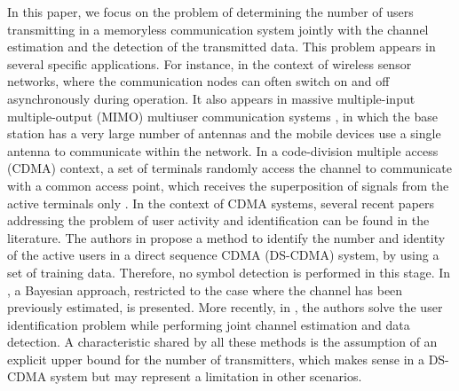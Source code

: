 \documentclass[a4paper]{article}
\begin{document}
In this paper, we focus on the problem of determining the number of users transmitting in a memoryless communication
system jointly with the channel estimation and the detection of the transmitted data. 
%
This problem appears in several specific applications. For instance, in the context of wireless sensor networks, where the communication nodes can often switch on and off asynchronously during operation. It also appears in massive multiple-input multiple-output (MIMO) multiuser communication systems \cite{Hoydis13}, in which the base station has a very large number of antennas and the mobile devices use a single antenna to communicate within the network. In a code-division multiple access (CDMA) context, a set of terminals randomly access the channel to communicate with a common access point, which receives the superposition of signals from the active terminals only \cite{Vazquez2013}. In the context of CDMA systems, several recent papers addressing the problem of user activity and identification can be found in the literature. The authors in \cite{AD10} propose a method to identify the number and identity of the active users in a direct sequence CDMA (DS-CDMA) system, by using a set of training data. Therefore, no symbol detection is performed in this stage.  In \cite{AD11}, a Bayesian approach, restricted to the case where the channel has been previously estimated, is presented. More recently, in \cite{Vazquez2013}, the authors solve the user identification problem while performing joint channel estimation and
data detection. 
%
A characteristic shared by all these methods is the assumption of an explicit upper bound for the number of transmitters, which makes sense in a DS-CDMA system but may represent a limitation in other scenarios.
\end{document}
